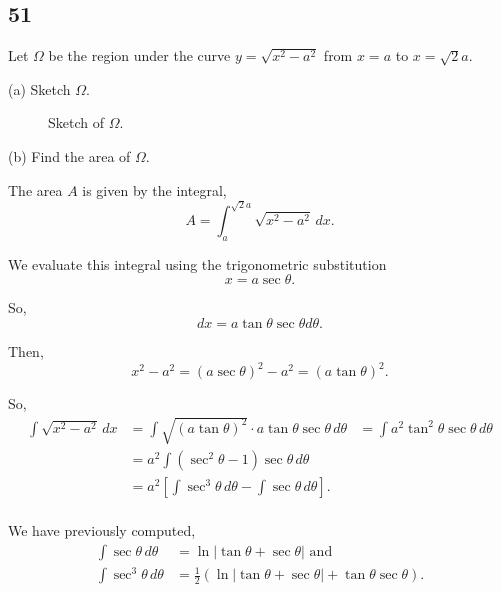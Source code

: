 \documentclass[../hw8]{subfiles}
\begin{document}
\subsection*{51}
Let $\Omega$ be the region under the curve
$y=\sqrt{x^2-a^2}$ from $x=a$ to $x=\sqrt{2}a$.

(a) Sketch $\Omega$.

\begin{figure*}[ht]
\centering
{}
\caption{Sketch of $\Omega$.}
\end{figure*}

(b) Find the area of $\Omega$.

The area $A$ is given by the integral, \[A=\int_{a}^{\sqrt{2}a} \sqrt{x^2-a^2}\,dx.\]

We evaluate this integral using the trigonometric substitution \[x=a\sec{\theta}.\]

So, \[dx=a\tan{\theta}\sec{\theta}d\theta.\]

Then, \[x^2-a^2={(a\sec{\theta})}^2-a^2={(a\tan{\theta})}^2.\]

So,
\begin{align*}
    \int\sqrt{x^2-a^2}\,dx &= \int \sqrt{{(a\tan{\theta})}^2}\cdot a\tan{\theta}\sec{\theta}\,d\theta
    &= \int a^2\tan^2{\theta}\sec{\theta}\,d\theta \\
    &= a^2 \int \left( \sec^2{\theta}-1 \right) \sec{\theta}\,d\theta \\
    &= a^2\left[ \int \sec^3{\theta}\,d\theta - \int\sec{\theta}\,d\theta \right]. \\
\end{align*}

We have previously computed,
\begin{align*}
    \int\sec{\theta}\,d\theta &= \ln{|\tan{\theta}+\sec{\theta}|} \text{ and} \\
    \int\sec^3{\theta}\,d\theta &= \frac{1}{2}\left( \ln{|\tan{\theta}+\sec{\theta}|} + \tan{\theta}\sec{\theta} \right). \\
\end{align*}
\end{document}
